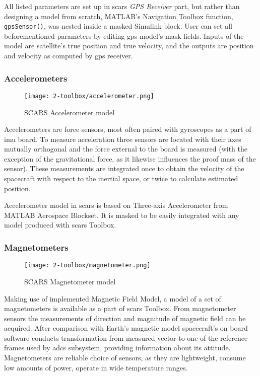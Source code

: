         All listed parameters are set up in \ac{scars} \textit{GPS Receiver} part, but rather than designing a model from scratch, MATLAB's Navigation Toolbox function, \verb|gpsSensor()|, was nested inside a masked Simulink block. User can set all beforementioned parameters by editing \ac{gps} model's mask fields. Inputs of the model are satellite's true position and true velocity, and the outputs are position and velocity as computed by \ac{gps} receiver.


    \subsubsection{Accelerometers}
        \begin{figure}[H]
            \centering
            \texttt{[image: 2-toolbox/accelerometer.png]}
            \caption{SCARS Accelerometer model}
            \label{fig:accelerometer}
        \end{figure}
        Accelerometers are force sensors, most often paired with gyroscopes as a part of \ac{imu} board. To measure acceleration three sensors are located with their axes mutually orthogonal and the force external to the board is measured (with the exception of the gravitational force, as it likewise influences the proof mass of the sensor). These measurements are integrated once to obtain the velocity of the spacecraft with respect to the inertial space, or twice to calculate estimated position.

        Accelerometer model in \ac{scars} is based on Three-axis Accelerometer from MATLAB Aerospace Blockset. It is masked to be easily integrated with any model produced with \ac{scars} Toolbox.



    \subsubsection{Magnetometers}
        \begin{figure}[H]
            \centering
            \texttt{[image: 2-toolbox/magnetometer.png]}
            \caption{SCARS Magnetometer model}
            \label{fig:magnetometer}
        \end{figure}

        Making use of implemented Magnetic Field Model, a model of a set of magnetometers is available as a part of \ac{scars} Toolbox. From magnetometer sensors the measurements of direction and magnitude of magnetic field can be acquired. After comparison with Earth's magnetic model spacecraft's on board software conducts transformation from measured vector to one of the reference frames used by \ac{adcs} subsystem, providing information about its attitude. Magnetometers are reliable choice of sensors, as they are lightweight, consume low amounts of power, operate in wide temperature ranges. 

